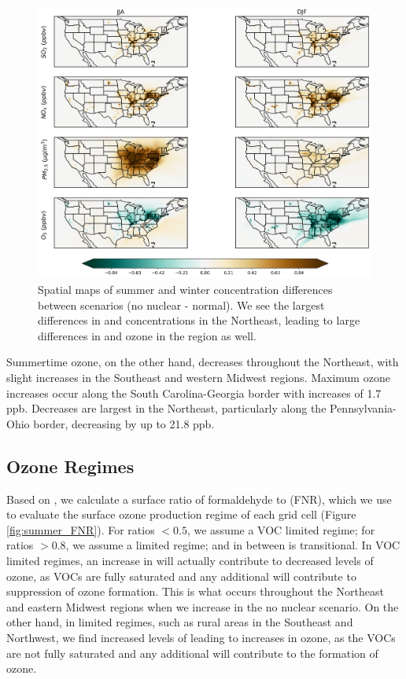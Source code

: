 \documentclass[12]{article}
\begin{document}
\begin{figure}[!htbp]
    \centering
    \includegraphics[width=1.01\textwidth]{ego_nonuclear_project/Figures/summer_winter_national_dif.png}
    \caption{Spatial maps of summer and winter concentration differences between scenarios (no nuclear - normal). We see the largest differences in  and  concentrations in the Northeast, leading to large differences in  and ozone in the region as well.} 
    \label{fig:summer_winter_dif}
\end{figure}

Summertime ozone, on the other hand, decreases throughout the Northeast, with slight increases in the Southeast and western Midwest regions. Maximum ozone increases occur along the South Carolina-Georgia border with increases of 1.7 ppb. Decreases are largest in the Northeast, particularly along the Pennsylvania-Ohio border, decreasing by up to 21.8 ppb. 

\subsection{Ozone Regimes}
Based on \cite{jin_evaluating_2017}, we calculate a surface ratio of formaldehyde to  (FNR), which we use to evaluate the surface ozone production regime of each grid cell (Figure \ref{fig:summer_FNR}). For ratios $<0.5$, we assume a VOC limited regime; for ratios $>0.8$, we assume a  limited regime; and in between is transitional. In VOC limited regimes, an increase in  will actually contribute to decreased levels of ozone, as VOCs are fully saturated and any additional  will contribute to suppression of ozone formation. This is what occurs throughout the Northeast and eastern Midwest regions when we increase  in the no nuclear scenario. On the other hand, in  limited regimes, such as rural areas in the Southeast and Northwest, we find increased levels of  leading to increases in ozone, as the VOCs are not fully saturated and any additional  will contribute to the formation of ozone.  
\end{document}
